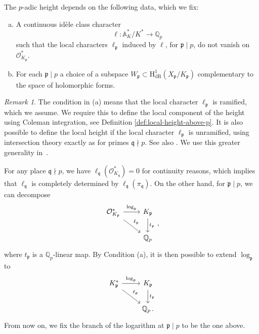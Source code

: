 \documentclass[11pt, a4paper]{amsart}
\renewcommand{\O}{\mathcal{O}}
\newcommand{\p}{\mathfrak{p}}
\newcommand{\q}{\mathfrak{q}}
\newcommand{\hdr}{\operatorname{H^1_{dR}}}
\renewcommand{\O}{\mathcal{O}}
\theoremstyle{remark}
\newtheorem{remark}[theorem]{Remark}
\numberwithin{equation}{section}
\begin{document}
The $p$-adic height depends on the  
following data, which we fix:
\begin{enumerate}[(a)]
  \item 
A continuous idèle class character
$$\ell\colon \mathbb{A}_K ^{\ast}/K^{\ast}\longrightarrow \mathbb{Q}_p$$
such that the local characters $\ell_\p$ induced by $\ell$, for $\p\mid p$, do not vanish 
on $\O^\ast_{K_\p}$.
\item 
For each $\p\mid p$ a choice of a subspace $W_\p \subset \hdr(X_\p/K_\p)$
    complementary to the space of holomorphic forms.
\end{enumerate}

	
\begin{remark}\label{rmk:ramified-unramified-over-p}
  The condition in (a) means that the local character $\ell_{\p}$ is ramified,
  which we assume. We require this to define the
  local component of the height using Coleman integration, see Definition
  \ref{def:local-height-above-p}. It is also possible to define the local
  height if the local character $\ell_{\p}$ is unramified, using
  intersection theory exactly as for primes $\q\nmid p$. See also \cite[\S2.2]{BBBM-QCNF}. 
  We use this greater generality in~\cite{LinQC}.
\end{remark}

For any place $\q\nmid p$, we have $\ell_\q(\O_{K_\q}^{\ast})=0$ for continuity reasons, which implies
that $\ell_\q$ is completely determined by $\ell_\q(\pi_\q)$. On the other hand, for
$\p\mid p$, we can decompose 
\begin{equation}\label{trace-on-O_K}
\begin{tikzcd}
 \O_{K_\p}^{\ast}  \arrow{r}{\log_{\p}}  \arrow{rd}{\ell_\p} 
  & K_\p \arrow{d}{t_\p} \\
    & \mathbb{Q}_p
\end{tikzcd}\,,
\end{equation}
where $t_\p$ is a $\mathbb{Q}_p$-linear map. By Condition (a),
it is then
possible to extend $\log_\p$ to 
\begin{equation}\label{trace}
\begin{tikzcd}
 K_\p^{\ast}  \arrow{r}{\log_{\p}}  \arrow{rd}{\ell_\p} 
  & K_\p \arrow{d}{t_\p} \\
    & \mathbb{Q}_p\,.
\end{tikzcd}
\end{equation}
From now on, we fix the branch of the logarithm at $\p\mid p$ to be the one above.
\end{document}

